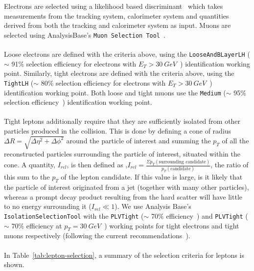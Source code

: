 Electrons are selected using a likelihood based discriminant~\cite{electronRecoAndID:paper} which takes measurements from the tracking system, calorimeter system and quantities derived from both the tracking and calorimeter system as input. Muons are selected using AnalysisBase's \texttt{Muon Selection Tool}~\cite{muon-selection-tool}.\\\\

Loose electrons are defined with the criteria above, using the \texttt{LooseAndBLayerLH} ($\sim$ 91$\%$ selection efficiency for electrons with $E_{T} > \SI{30}{GeV}$~\cite{electronIDefficiency}) identification working point. Similarly, tight electrons are defined with the criteria above, using the \texttt{TightLH} ($\sim$ 80$\%$ selection efficiency for electrons with $E_{T} > \SI{30}{GeV}$~\cite{electronIDefficiency}) identification working point. Both loose and tight muons use the \texttt{Medium} ($\sim$ 95$\%$ selection efficiency~\cite{muonIDEfficiency}) identification working point.\\\\

Tight leptons additionally require that they are sufficiently isolated from other particles produced in the collision. This is done by defining a cone of radius $\Delta R = \sqrt{\Delta \eta^{2} + \Delta \phi^{2}}$ around the particle of interest and summing the $p_{T}$ of all the reconstructed particles surrounding the particle of interest, situated within the cone. A quantity, $I_{rel}$, is then defined as ,$I_{rel} = \frac{\Sigma p_{T}(\text{surrounding candidate})  }{p_{T}(\text{candidate})}$, the ratio of this sum to the $p_{T}$ of the lepton candidate. If this value is large, is it likely that the particle of interest originated from a jet (together with many other particles), whereas a prompt decay product resulting from the hard scatter will have little to no energy surrounding it ($I_{rel} \ll 1$). We use Analysis Base's \texttt{IsolationSelectionTool} with the \texttt{PLVTight} ($\sim$ 70$\%$ efficiency~\cite{elecIsolationEfficiency})  and \texttt{PLVTight} ($\sim$ 70$\%$ efficiency at $p_{T} = \SI{30}{GeV}$~\cite{muonIsolationEfficiency}) working points for tight electrons and tight muons respectively (following the current recommendations~\cite{recommendedIsolationWPs}).\\\\


In Table~\ref{tab:lepton-selection}, a summary of the selection criteria for leptons is shown.

